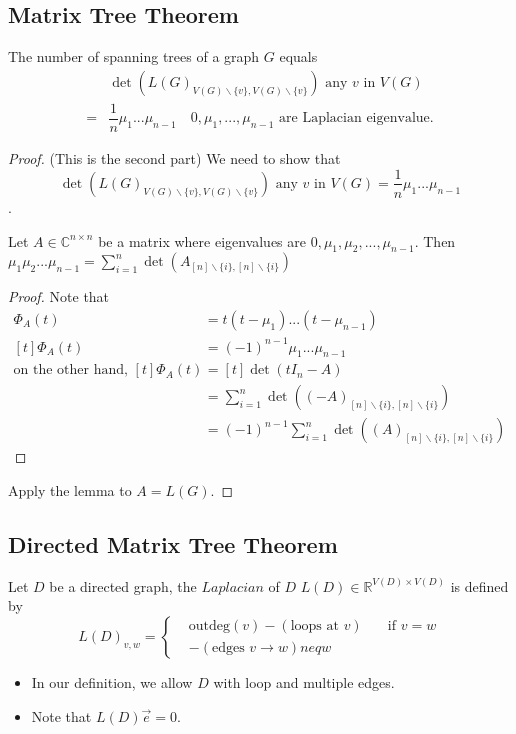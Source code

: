 \subsection{Matrix Tree Theorem}
\begin{theorem}
The number of spanning trees of a graph $G$ equals
\begin{align*}
&\det(L(G)_{V(G)\backslash \{v\},V(G)\backslash \{v\}}) \text{ any }v \text{ in }V(G)\\
=&\dfrac{1}{n}\mu_1...\mu_{n-1} \hspace{1em}0,\mu_1,...,\mu_{n-1} \text{ are Laplacian eigenvalue}.
\end{align*}
\end{theorem}

\begin{proof}
(This is the second part)
We need to show that
$$\det(L(G)_{V(G)\backslash \{v\},V(G)\backslash \{v\}}) \text{ any }v \text{ in }V(G)
=\dfrac{1}{n}\mu_1...\mu_{n-1}$$.
\begin{lemma}
Let $A\in \mathbb{C}^{n\times n}$ be a matrix where eigenvalues are $0,\mu_1,\mu_2,...,\mu_{n-1}$. Then $\mu_1\mu_2...\mu_{n-1} = \sum\limits_{i=1}^n\det(A_{[n]\backslash \{i\},[n]\backslash \{i\}})$ 
\end{lemma}
\begin{proof}
Note that
\begin{align*}
\Phi_A(t) &= t(t-\mu_1)...(t-\mu_{n-1})\\
[t]\Phi_A(t) &= (-1)^{n-1}\mu_1...\mu_{n-1}\\
\text{on the other hand, } [t]\Phi_A(t) &=[t]\det(tI_n-A)\\
&=\sum\limits_{i=1}^n\det((-A)_{[n]\backslash \{i\},[n]\backslash \{i\}})\\&=(-1)^{n-1}\sum\limits_{i=1}^n\det((A)_{[n]\backslash \{i\},[n]\backslash \{i\}})
\end{align*}
\end{proof}
Apply the lemma to $A=L(G)$.
\end{proof}

\subsection{Directed Matrix Tree Theorem}
\begin{definition}
Let $D$ be a directed graph, the $Laplacian$ of $D$ $L(D)\in \mathbb{R}^{V(D)\times V(D)}$ is defined by
$$L(D)_{v,w} = \left\{\begin{aligned}
 &\text{outdeg}(v)
 -(\text{loops at }v)& \hspace{1em} \text{if }v=w\\
&-(\text{edges }v\rightarrow w)neq w
\end{aligned} \right. $$

\end{definition}
\begin{remark}
\begin{itemize}
\item In our definition, we allow $D$ with loop and multiple edges.
\item Note that $L(D)\vec{e}=0$.
\end{itemize}
\end{remark}


